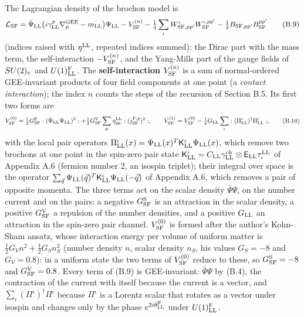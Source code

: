 \documentclass[
  10pt,
]{article}
\begin{document}
The Lagrangian density of the brochon model is
\[\mathcal L_{\rm SF}=\bar\Psi_{\rm LL}\big(i\gamma^p_{\rm LL}\nabla^{\rm GEE}_p-m_{\rm LL}\big)\Psi_{\rm LL}-V^{(n)}_{\rm SF}-\tfrac14\sum_\iota W^\iota_{{\rm SF},pp'}W^{\iota,pp'}_{\rm SF}-\tfrac14B_{{\rm SF},pp'}B^{pp'}_{\rm SF}\tag{B.9}\]
(indices raised with \(\eta^{\rm LL}\), repeated indices summed): the
Dirac part with the mass term, the self-interaction
\(-V^{(n)}_{\rm SF}\), and the Yang-Mills part of the gauge fields of
\(SU(2)_{\rm v}\) and \(U(1)^{\rm F}_{\rm LL}\). The
\textbf{self-interaction} \(V^{(n)}_{\rm SF}\) is a sum of
normal-ordered GEE-invariant products of four field components at one
point (a \emph{contact interaction}); the index \(n\) counts the steps
of the recursion of Section B.5. Its first two forms are
\[V^{(0)}_{\rm SF}=\tfrac12G^{\rm S}_{\rm SF}:(\bar\Psi_{\rm LL}\Psi_{\rm LL})^2:+\tfrac12G^{\rm V}_{\rm SF}\sum_p\eta^{\rm LL}_{pp}:(j^{{\rm F},p}_{\rm SF})^2:,\qquad V^{(1)}_{\rm SF}=V^{(0)}_{\rm SF}-\tfrac14G_{\rm LL}\sum_\iota:(\Pi^\iota_{\rm LL})^\dagger\Pi^\iota_{\rm LL}:,\tag{B.10}\]
with the local pair operators
\(\Pi^\iota_{\rm LL}(x)=\Psi_{\rm LL}(x)^T\mathsf K^\iota_{\rm LL}\Psi_{\rm LL}(x)\),
which remove two brochons at one point in the spin-zero pair state
\(\mathsf K^\iota_{\rm LL}=C_{\rm LL}\gamma^{\rm ch}_{\rm LL}\otimes\mathsf E_{\rm LL}\tau^{\rm LL}_\iota\)
of Appendix A.6 (fermion number 2, an isospin triplet); their integral
over space is the operator
\(\sum_{\vec q}\Psi_{\rm LL}(\vec q)^T\mathsf K^\iota_{\rm LL}\Psi_{\rm LL}(-\vec q)\)
of Appendix A.6, which removes a pair of opposite momenta. The three
terms act on the scalar density \(\bar\Psi\Psi\), on the number current
and on the pairs: a negative \(G^{\rm S}_{\rm SF}\) is an attraction in
the scalar density, a positive \(G^{\rm V}_{\rm SF}\) a repulsion of the
number densities, and a positive \(G_{\rm LL}\) an attraction in the
spin-zero pair channel. \(V^{(0)}_{\rm SF}\) is formed after the
author's Kohn-Sham ansatz, whose interaction energy per volume of
uniform matter is \(\tfrac12G_Vn^2+\tfrac12G_Sn_S^2\) (number density
\(n\), scalar density \(n_S\), his values \(G_S=-8\) and \(G_V=0.8\)):
in a uniform state the two terms of \(V^{(0)}_{\rm SF}\) reduce to
these, so \(G^{\rm S}_{\rm SF}=-8\) and \(G^{\rm V}_{\rm SF}=0.8\).
Every term of (B.9) is GEE-invariant: \(\bar\Psi\Psi\) by (B.4), the
contraction of the current with itself because the current is a vector,
and \(\sum_\iota(\Pi^\iota)^\dagger\Pi^\iota\) because \(\Pi^\iota\) is
a Lorentz scalar that rotates as a vector under isospin and changes only
by the phase \(e^{2i\theta^{\rm F}_{\rm LL}}\) under
\(U(1)^{\rm F}_{\rm LL}\).
\end{document}
